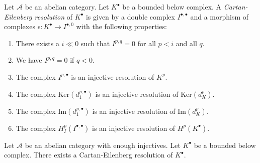 \begin{definition}
\label{definition-cartan-eilenberg}
Let $\mathcal{A}$ be an abelian category.
Let $K^\bullet$ be a bounded below complex.
A {\it Cartan-Eilenberg resolution} of $K^\bullet$
is given by a double complex $I^{\bullet, \bullet}$
and a morphism of complexes $\epsilon : K^\bullet \to I^{\bullet, 0}$
with the following properties:
\begin{enumerate}
\item There exists a $i \ll 0$ such that $I^{p, q} = 0$ for all $p < i$
and all $q$.
\item We have $I^{p, q} = 0$ if $q < 0$.
\item The complex $I^{p, \bullet}$ is an injective resolution of $K^p$.
\item The complex $\text{Ker}(d_1^{p, \bullet})$ is an injective resolution
of $\text{Ker}(d_K^p)$.
\item The complex $\text{Im}(d_1^{p, \bullet})$ is an injective resolution
of $\text{Im}(d_K^p)$.
\item The complex $H^p_{I}(I^{\bullet, \bullet})$ is an injective resolution
of $H^p(K^\bullet)$.
\end{enumerate}
\end{definition}

\begin{lemma}
\label{lemma-cartan-eilenberg}
Let $\mathcal{A}$ be an abelian category with enough injectives.
Let $K^\bullet$ be a bounded below complex.
There exists a Cartan-Eilenberg resolution of $K^\bullet$.
\end{lemma}

